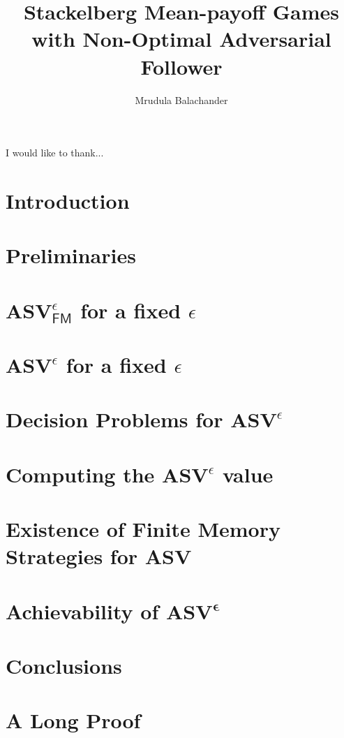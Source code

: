 \documentclass{report}
\begin{document}
\title{Stackelberg Mean-payoff Games with Non-Optimal Adversarial Follower}
\author{Mrudula Balachander}
 
\beforepreface
{}
	
I would like to thank...
\afterpreface

\chapter{Introduction}
	\label{sec:intro}
	

\chapter{Preliminaries}
  	\label{sec:prelim}
  	

\chapter{$\mathbf{ASV}^{\epsilon}_{\mathsf{FM}}$ for a fixed $\epsilon$}
	\label{sec:FMStrategy}
	

\chapter{$\mathbf{ASV}^{\epsilon}$ for a fixed $\epsilon$}
	

\chapter{Decision Problems for $\mathbf{ASV}^{\epsilon}$}
	

\chapter{Computing the $\mathbf{ASV}^{\epsilon}$ value}
	

\chapter{Existence of Finite Memory Strategies for ASV}
	\label{sec:FMASV}
	

\chapter{Achievability of $\mathbf{ASV^{\epsilon}}$}
	

\chapter{Conclusions}

\appendix
	\chapter{A Long Proof}
		


	
\end{document}
